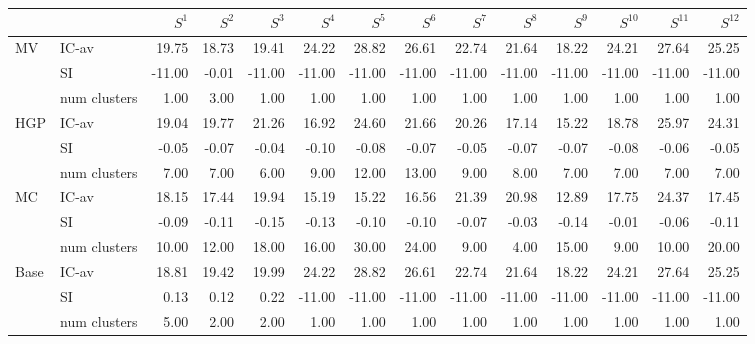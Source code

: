 \begin{tabular}{llrrrrrrrrrrrr}
\toprule
 &  & $S^{1}$ & $S^{2}$ & $S^{3}$ & $S^{4}$ & $S^{5}$ & $S^{6}$ & $S^{7}$ & $S^{8}$ & $S^{9}$ & $S^{10}$ & $S^{11}$ & $S^{12}$ \\
\midrule
\multirow[c]{3}{*}{MV} & IC-av & 19.75 & 18.73 & 19.41 & 24.22 & 28.82 & 26.61 & 22.74 & 21.64 & 18.22 & 24.21 & 27.64 & 25.25 \\
 & SI & -11.00 & -0.01 & -11.00 & -11.00 & -11.00 & -11.00 & -11.00 & -11.00 & -11.00 & -11.00 & -11.00 & -11.00 \\
 & num clusters & 1.00 & 3.00 & 1.00 & 1.00 & 1.00 & 1.00 & 1.00 & 1.00 & 1.00 & 1.00 & 1.00 & 1.00 \\
\multirow[c]{3}{*}{HGP} & IC-av & 19.04 & 19.77 & 21.26 & 16.92 & 24.60 & 21.66 & 20.26 & 17.14 & 15.22 & 18.78 & 25.97 & 24.31 \\
 & SI & -0.05 & -0.07 & -0.04 & -0.10 & -0.08 & -0.07 & -0.05 & -0.07 & -0.07 & -0.08 & -0.06 & -0.05 \\
 & num clusters & 7.00 & 7.00 & 6.00 & 9.00 & 12.00 & 13.00 & 9.00 & 8.00 & 7.00 & 7.00 & 7.00 & 7.00 \\
\multirow[c]{3}{*}{MC} & IC-av & 18.15 & 17.44 & 19.94 & 15.19 & 15.22 & 16.56 & 21.39 & 20.98 & 12.89 & 17.75 & 24.37 & 17.45 \\
 & SI & -0.09 & -0.11 & -0.15 & -0.13 & -0.10 & -0.10 & -0.07 & -0.03 & -0.14 & -0.01 & -0.06 & -0.11 \\
 & num clusters & 10.00 & 12.00 & 18.00 & 16.00 & 30.00 & 24.00 & 9.00 & 4.00 & 15.00 & 9.00 & 10.00 & 20.00 \\
\multirow[c]{3}{*}{Base} & IC-av & 18.81 & 19.42 & 19.99 & 24.22 & 28.82 & 26.61 & 22.74 & 21.64 & 18.22 & 24.21 & 27.64 & 25.25 \\
 & SI & 0.13 & 0.12 & 0.22 & -11.00 & -11.00 & -11.00 & -11.00 & -11.00 & -11.00 & -11.00 & -11.00 & -11.00 \\
 & num clusters & 5.00 & 2.00 & 2.00 & 1.00 & 1.00 & 1.00 & 1.00 & 1.00 & 1.00 & 1.00 & 1.00 & 1.00 \\
\bottomrule
\end{tabular}
